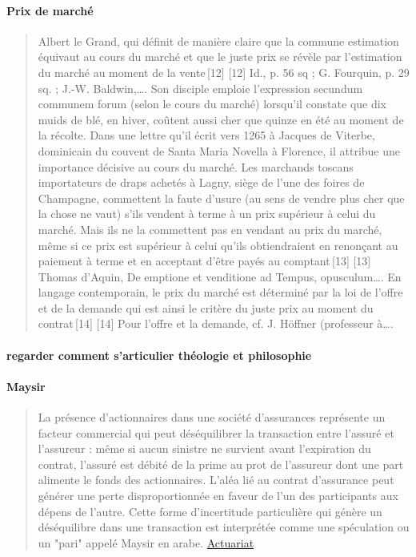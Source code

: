  \paragraph{Prix de marché}
 \begin{quote}
     Albert le Grand, qui définit de manière claire que la commune estimation équivaut au cours du marché et que le juste prix se révèle par l’estimation du marché au moment de la vente [12]
[12]
Id., p. 56 sq ; G. Fourquin, p. 29 sq. ; J.-W. Baldwin,…. Son disciple emploie l’expression secundum communem forum (selon le cours du marché) lorsqu’il constate que dix muids de blé, en hiver, coûtent aussi cher que quinze en été au moment de la récolte. Dans une lettre qu’il écrit vers 1265 à Jacques de Viterbe, dominicain du couvent de Santa Maria Novella à Florence, il attribue une importance décisive au cours du marché. Les marchands toscans importateurs de draps achetés à Lagny, siège de l’une des foires de Champagne, commettent la faute d’usure (au sens de vendre plus cher que la chose ne vaut) s’ils vendent à terme à un prix supérieur à celui du marché. Mais ils ne la commettent pas en vendant au prix du marché, même si ce prix est supérieur à celui qu’ils obtiendraient en renonçant au paiement à terme et en acceptant d’être payés au comptant [13]
[13]
Thomas d’Aquin, De emptione et venditione ad Tempus, opusculum…. En langage contemporain, le prix du marché est déterminé par la loi de l’offre et de la demande qui est ainsi le critère du juste prix au moment du contrat [14]
[14]
Pour l’offre et la demande, cf. J. Höffner (professeur à….
 \end{quote}
 \paragraph{regarder comment s'articulier théologie et philosophie}
 
 
 
 
 \paragraph{Maysir}
 \begin{quote}
 La présence d'actionnaires dans une société d'assurances représente un facteur commercial qui peut déséquilibrer la transaction entre l'assuré et l'assureur : même si aucun sinistre ne survient avant l'expiration du contrat, l'assuré est débité de la prime au prot de l'assureur dont une part alimente le fonds des actionnaires. L'aléa lié au contrat d'assurance peut générer une perte disproportionnée en faveur de l'un des participants aux dépens de l'autre. Cette forme d'incertitude particulière qui génère un déséquilibre dans une transaction est interprétée comme une spéculation ou un "pari" appelé Maysir en arabe. \href{http://www.ressources-actuarielles.net/EXT/ISFA/1226-02.nsf/0/8c814ff5f2bae57ec1257e1a004407b6/\%24FILE/Memoire_ISFA_Tontines_et_Takaful_Bendimerad_Version_avec_Couverture.pdf}{Actuariat}
 \end{quote}
 
